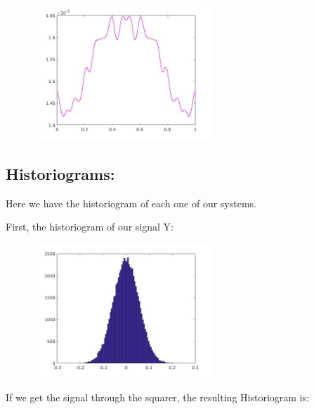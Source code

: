 \documentclass[a4paper,11pt]{article}
\begin{document}
\begin{figure}[!hp]
    \begin{center}
    \includegraphics[width=0.6\textwidth]{images/lab3_50.jpg}
    \end{center}
\end{figure}

\newpage

\subsection{Historiograms:}

Here we have the historiogram of each one of our systems.

First, the historiogram of our signal Y:

\begin{figure}[!hp]
    \begin{center}
    \includegraphics[width=0.6\textwidth]{images/lab3_52.jpg}
    \end{center}
\end{figure}

If we get the signal through the squarer, the resulting Historiogram is:
\end{document}
